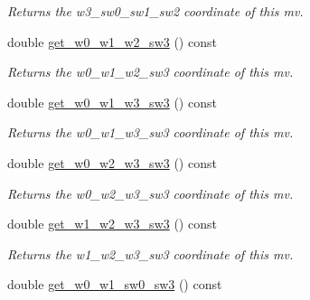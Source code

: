 \begin{DoxyCompactItemize}
\begin{DoxyCompactList}\small\item\em Returns the w3\-\_\-sw0\-\_\-sw1\-\_\-sw2 coordinate of this mv. \end{DoxyCompactList}\item 
\hypertarget{classe3ga_1_1mv_a27a4db310ca1159b519e07b575fa730e}{double \hyperlink{classe3ga_1_1mv_a27a4db310ca1159b519e07b575fa730e}{get\-\_\-w0\-\_\-w1\-\_\-w2\-\_\-sw3} () const }\label{classe3ga_1_1mv_a27a4db310ca1159b519e07b575fa730e}

\begin{DoxyCompactList}\small\item\em Returns the w0\-\_\-w1\-\_\-w2\-\_\-sw3 coordinate of this mv. \end{DoxyCompactList}\item 
\hypertarget{classe3ga_1_1mv_a5fa376c49052447c43131b41b2df2302}{double \hyperlink{classe3ga_1_1mv_a5fa376c49052447c43131b41b2df2302}{get\-\_\-w0\-\_\-w1\-\_\-w3\-\_\-sw3} () const }\label{classe3ga_1_1mv_a5fa376c49052447c43131b41b2df2302}

\begin{DoxyCompactList}\small\item\em Returns the w0\-\_\-w1\-\_\-w3\-\_\-sw3 coordinate of this mv. \end{DoxyCompactList}\item 
\hypertarget{classe3ga_1_1mv_a4f9e05f6b466ffb9e0cf05e81ec3347d}{double \hyperlink{classe3ga_1_1mv_a4f9e05f6b466ffb9e0cf05e81ec3347d}{get\-\_\-w0\-\_\-w2\-\_\-w3\-\_\-sw3} () const }\label{classe3ga_1_1mv_a4f9e05f6b466ffb9e0cf05e81ec3347d}

\begin{DoxyCompactList}\small\item\em Returns the w0\-\_\-w2\-\_\-w3\-\_\-sw3 coordinate of this mv. \end{DoxyCompactList}\item 
\hypertarget{classe3ga_1_1mv_a046a8e2bda7233a2ef323578572e80c0}{double \hyperlink{classe3ga_1_1mv_a046a8e2bda7233a2ef323578572e80c0}{get\-\_\-w1\-\_\-w2\-\_\-w3\-\_\-sw3} () const }\label{classe3ga_1_1mv_a046a8e2bda7233a2ef323578572e80c0}

\begin{DoxyCompactList}\small\item\em Returns the w1\-\_\-w2\-\_\-w3\-\_\-sw3 coordinate of this mv. \end{DoxyCompactList}\item 
\hypertarget{classe3ga_1_1mv_a3919a2cf9b099c1de73eee011e96b4fc}{double \hyperlink{classe3ga_1_1mv_a3919a2cf9b099c1de73eee011e96b4fc}{get\-\_\-w0\-\_\-w1\-\_\-sw0\-\_\-sw3} () const }\label{classe3ga_1_1mv_a3919a2cf9b099c1de73eee011e96b4fc}


\end{DoxyCompactItemize}

